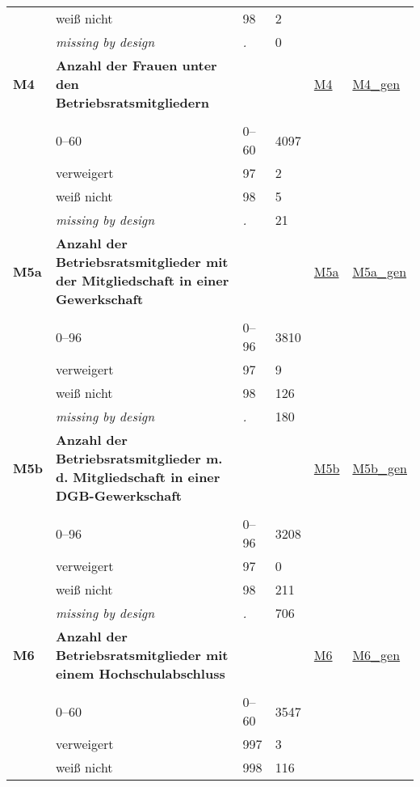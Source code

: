 \begin{longtable}{| L{2.45cm} | L{6cm} | C{1.5cm} | R{1cm} | C{2.25cm} | C{2.25cm} |}
   & weiß nicht & 98 & 2 &  &  \\ 
   & \textit{missing by design} & \textit{.} & 0 &  &  \\ 
   \midrule
\textbf{M4}\label{var:M4} & \textbf{Anzahl der Frauen unter den Betriebsratsmitgliedern} &  &  & \hyperref[M4]{M4} & \hyperref[var:suf:M4:gen]{M4\_gen} \\ 
   &  &  &  &  &  \\ 
   & 0--60 & 0--60 & 4097 &  &  \\ 
   & verweigert & 97 & 2 &  &  \\ 
   & weiß nicht & 98 & 5 &  &  \\ 
   & \textit{missing by design} & \textit{.} & 21 &  &  \\ 
   \midrule
\textbf{M5a}\label{var:M5a} & \textbf{Anzahl der Betriebsratsmitglieder mit der Mitgliedschaft in einer Gewerkschaft} &  &  & \hyperref[M5a]{M5a} & \hyperref[var:suf:M5a:gen]{M5a\_gen} \\ 
   &  &  &  &  &  \\ 
   & 0--96 & 0--96 & 3810 &  &  \\ 
   & verweigert & 97 & 9 &  &  \\ 
   & weiß nicht & 98 & 126 &  &  \\ 
   & \textit{missing by design} & \textit{.} & 180 &  &  \\ 
   \midrule
\textbf{M5b}\label{var:M5b} & \textbf{Anzahl der Betriebsratsmitglieder m. d. Mitgliedschaft in einer DGB-Gewerkschaft} &  &  & \hyperref[M5b]{M5b} & \hyperref[var:suf:M5b:gen]{M5b\_gen} \\ 
   &  &  &  &  &  \\ 
   & 0--96 & 0--96 & 3208 &  &  \\ 
   & verweigert & 97 & 0 &  &  \\ 
   & weiß nicht & 98 & 211 &  &  \\ 
   & \textit{missing by design} & \textit{.} & 706 &  &  \\ 
   \midrule
\textbf{M6}\label{var:M6} & \textbf{Anzahl der Betriebsratsmitglieder mit einem Hochschulabschluss} &  &  & \hyperref[M6]{M6} & \hyperref[var:suf:M6:gen]{M6\_gen} \\ 
   &  &  &  &  &  \\ 
   & 0--60 & 0--60 & 3547 &  &  \\ 
   & verweigert & 997 & 3 &  &  \\ 
   & weiß nicht & 998 & 116 &  &  \\ 

\end{longtable}
